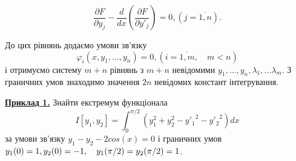 \documentclass[12pt,a4paper]{article}
\begin{document}
	\begin{equation}\label{eq:system_of_Euler_equations}
		\frac{\partial F}{\partial y_j} - \frac{d}{dx} \left(\frac{\partial F}{\partial y'_j}\right) = 0, (j = \overline{1, n}).
	\end{equation}

	До цих рівнянь додаємо умови зв’язку
	\begin{equation}
		\varphi_i(x, y_1, \ldots, y_n) = 0, (i = \overline{1, m}, \quad m < n)
	\end{equation}
	і отримуємо систему $m+n$ рівнянь з $m+n$ невідомими $ y_1, \ldots, y_n, \lambda_1, \ldots \lambda_m $.
	З граничних умов знаходимо значення $2n$ невідомих констант інтегрування.

	\underline{\textbf{Приклад 1.}} Знайти екстремум функціонала
	$$I[y_1, y_2] = \int_{0}^{\pi/2} (y_1^{2} + y_2^{2} - {y'_1}^{2} - {y'_2}^{2})dx$$
	за умови зв’язку $y_1 - y_2 - 2cos(x) = 0$ і граничних умов
	$y_1(0) = 1, \\ y_2(0) = -1,\quad y_1(\pi/2) = y_2(\pi/2) = 1$.
	
\end{document}
